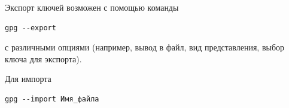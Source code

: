 \documentclass[10pt,a4paper]{article}
\begin{document}
Экспорт ключей возможен с помощью команды
\begin{verbatim}
gpg --export
\end{verbatim}
с различными опциями (например, вывод в файл, вид представления, выбор ключа для экспорта).

Для импорта
\begin{verbatim}
gpg --import Имя_файла
\end{verbatim}



\end{document}
